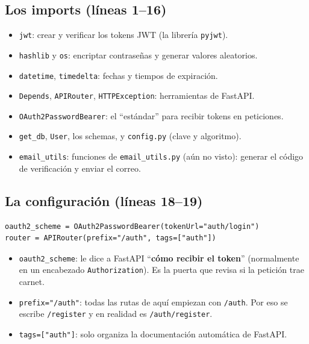 \documentclass[11pt,a4paper]{article}
\begin{document}
\subsection{Los imports (líneas 1--16)}

\begin{itemize}
    \item \texttt{jwt}: crear y verificar los tokens JWT (la librería \texttt{pyjwt}).
    \item \texttt{hashlib} y \texttt{os}: encriptar contraseñas y generar valores aleatorios.
    \item \texttt{datetime}, \texttt{timedelta}: fechas y tiempos de expiración.
    \item \texttt{Depends}, \texttt{APIRouter}, \texttt{HTTPException}: herramientas de FastAPI.
    \item \texttt{OAuth2PasswordBearer}: el ``estándar'' para recibir tokens en peticiones.
    \item \texttt{get\_db}, \texttt{User}, los schemas, y \texttt{config.py} (clave y algoritmo).
    \item \texttt{email\_utils}: funciones de \texttt{email\_utils.py} (aún no visto):
    generar el código de verificación y enviar el correo.
\end{itemize}

\subsection{La configuración (líneas 18--19)}

\begin{lstlisting}
oauth2_scheme = OAuth2PasswordBearer(tokenUrl="auth/login")
router = APIRouter(prefix="/auth", tags=["auth"])
\end{lstlisting}

\begin{itemize}
    \item \texttt{oauth2\_scheme}: le dice a FastAPI ``\textbf{cómo recibir el token}''
    (normalmente en un encabezado \texttt{Authorization}). Es la puerta que revisa si la
    petición trae carnet.
    \item \texttt{prefix="/auth"}: todas las rutas de aquí empiezan con \texttt{/auth}.
    Por eso se escribe \texttt{/register} y en realidad es \texttt{/auth/register}.
    \item \texttt{tags=["auth"]}: solo organiza la documentación automática de FastAPI.
\end{itemize}
\end{document}

